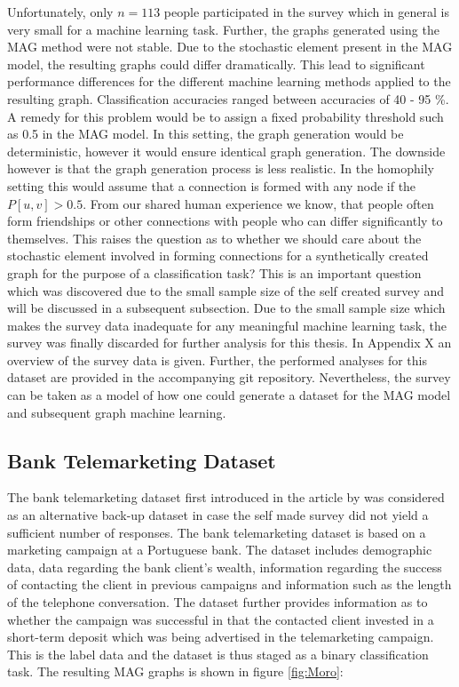   \noindent Unfortunately, only $n=113$ people participated in the survey which 
  in general is very small for a machine learning task.
  Further, the graphs generated using the MAG method were not stable. Due to
  the stochastic element present in the MAG model, the resulting graphs could
  differ dramatically. This lead to significant performance differences for the
  different machine learning methods applied to the resulting graph.
  Classification accuracies ranged between accuracies of 40 - 95 \%. A remedy
  for this problem would be to assign a fixed probability threshold such as 0.5
  in the MAG model. In this setting, the graph generation would be
  deterministic, however it would ensure identical graph generation. The
  downside however is that the graph generation process is less realistic. In
  the homophily setting this would assume that a connection is formed with any
  node if the $P[u,v]>0.5$. From our shared human experience we know, that
  people often form friendships or other connections with people who can differ
  significantly to themselves. This raises the question as to whether we should
  care about the stochastic element involved in forming connections for a
  synthetically created graph for the purpose of a classification task? This is
  an important question which was discovered due to the small sample size of
  the self created survey and will be discussed in a subsequent subsection. 
  Due to the small sample size which makes the survey data inadequate for any
  meaningful machine learning task, the survey was finally discarded for
  further analysis for this thesis. In Appendix X an overview of the survey
  data is given. Further, the performed analyses for this dataset are provided
  in the accompanying git repository. Nevertheless, the survey can be taken as
  a model of how one could generate a dataset for the MAG model and subsequent
  graph machine learning. 


  \subsection{Bank Telemarketing Dataset}

  The bank telemarketing dataset first introduced in the article by
  \cite{moro2011using,moro2014data} was considered as an alternative back-up 
  dataset in case the self made survey did not yield a sufficient number of 
  responses. The bank telemarketing dataset is based on a marketing campaign at 
  a Portuguese bank. The dataset includes demographic data, data regarding the 
  bank client's wealth, information regarding the success of contacting the 
  client in previous campaigns and information such as the length of the 
  telephone conversation. The dataset further provides information as to whether 
  the campaign was successful in that the contacted client invested in a short-term 
  deposit which was being advertised in the telemarketing campaign. This is the
  label data and the dataset is thus staged as a binary classification task.
  The resulting MAG graphs is shown in figure \ref{fig:Moro}:
 
